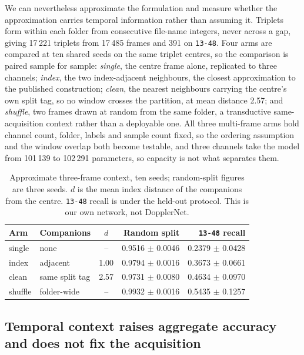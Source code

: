 \documentclass[11pt,a4paper]{article}
\newcommand{\s}[1]{\texttt{#1}}            %
\newcommand{\tgt}{\s{13-48}}               %
\begin{document}
We can nevertheless approximate the formulation and measure whether the approximation carries temporal information rather than assuming it. Triplets form within each folder from consecutive file-name integers, never across a gap, giving 17\,221 triplets from 17\,485 frames and 391 on \tgt. Four arms are compared at ten shared seeds on the same triplet centres, so the comparison is paired sample for sample: \emph{single}, the centre frame alone, replicated to three channels; \emph{index}, the two index-adjacent neighbours, the closest approximation to the published construction; \emph{clean}, the nearest neighbours carrying the centre's own split tag, so no window crosses the partition, at mean distance 2.57; and \emph{shuffle}, two frames drawn at random from the same folder, a transductive same-acquisition context rather than a deployable one. All three multi-frame arms hold channel count, folder, labels and sample count fixed, so the ordering assumption and the window overlap both become testable, and three channels take the model from 101\,139 to 102\,291 parameters, so capacity is not what separates them.

\begin{table}[!htbp]
\caption{Approximate three-frame context, ten seeds; random-split figures are
three seeds. $d$ is the mean index distance of the companions from the centre.
\tgt{} recall is under the held-out protocol. This is our own network, not
DopplerNet.}
\label{tab:temporal}
\centering
\small
\begin{tabular}{@{}llcrr@{}}
\toprule
Arm & Companions & $d$ & Random split & \tgt{} recall \\
\midrule
single  & none            & --   & 0.9516 $\pm$ 0.0046 & 0.2379 $\pm$ 0.0428 \\
index   & adjacent        & 1.00 & 0.9794 $\pm$ 0.0016 & 0.3673 $\pm$ 0.0661 \\
clean   & same split tag  & 2.57 & 0.9731 $\pm$ 0.0080 & 0.4634 $\pm$ 0.0970 \\
shuffle & folder-wide     & --   & 0.9932 $\pm$ 0.0016 & 0.5435 $\pm$ 0.1257 \\
\bottomrule
\end{tabular}
\end{table}

\subsection{Temporal context raises aggregate accuracy and does not fix the acquisition}
\end{document}
